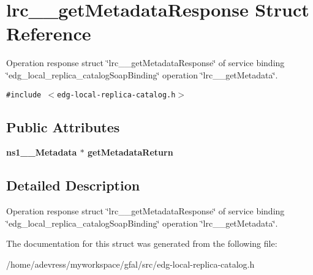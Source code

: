 \section{lrc\_\-\_\-get\-Metadata\-Response Struct Reference}
\label{structlrc____getMetadataResponse}
Operation response struct \char`\"{}lrc\_\-\_\-get\-Metadata\-Response\char`\"{} of service binding \char`\"{}edg\_\-local\_\-replica\_\-catalog\-Soap\-Binding\char`\"{} operation \char`\"{}lrc\_\-\_\-get\-Metadata\char`\"{}.  


{\tt \#include $<$edg-local-replica-catalog.h$>$}

\subsection*{Public Attributes}
\begin{CompactItemize}
\item 
\bf{ns1\_\-\_\-Metadata} $\ast$ \textbf{get\-Metadata\-Return}\label{structlrc____getMetadataResponse_84ca1102f9aeb0ebb420b79f15c6aa20}

\end{CompactItemize}


\subsection{Detailed Description}
Operation response struct \char`\"{}lrc\_\-\_\-get\-Metadata\-Response\char`\"{} of service binding \char`\"{}edg\_\-local\_\-replica\_\-catalog\-Soap\-Binding\char`\"{} operation \char`\"{}lrc\_\-\_\-get\-Metadata\char`\"{}. 



The documentation for this struct was generated from the following file:\begin{CompactItemize}
\item 
/home/adevress/myworkspace/gfal/src/edg-local-replica-catalog.h\end{CompactItemize}
